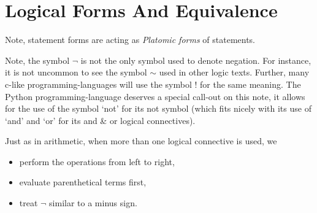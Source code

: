 



\guard

\section{Logical Forms And Equivalence}
\label{sec:logicalFormsAndEquivalence}


Note, statement forms are acting as {\it Platomic forms} of statements.



Note, the symbol $\neg$ is not the only symbol used to denote negation.
For instance, it is not uncommon to see the symbol $\sim$ used in other logic texts.
Further, many c-like programming-languages will use the symbol $!$ for the same meaning.
The Python programming-language deserves a special call-out on this note, it allows for the use of the symbol `not' for its not symbol (which fits nicely with its use of `and' and `or' for its and \& or logical connectives).




Just as in arithmetic, when more than one logical connective is used, we
\begin{itemize}
  \item perform the operations from left to right,
  \item evaluate parenthetical terms first,
  \item treat $\neg$ similar to a minus sign.
\end{itemize}





















